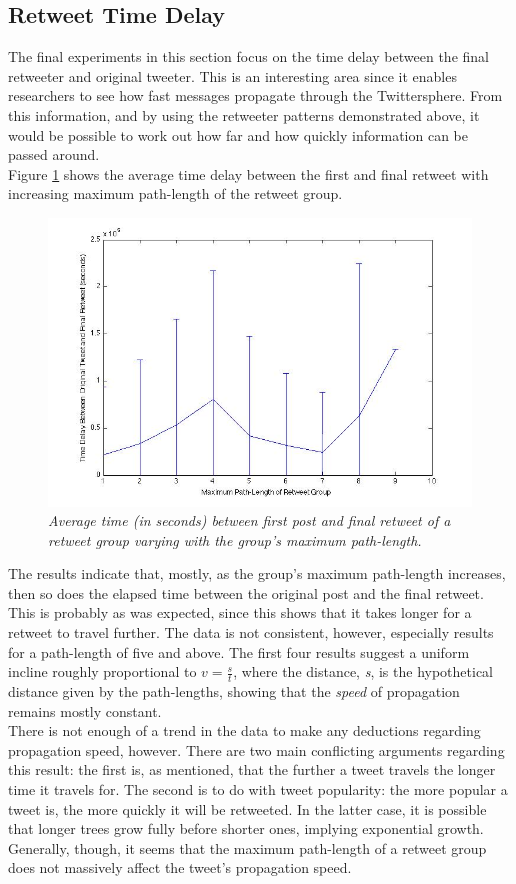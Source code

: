 \subsection{Retweet Time Delay}
\label{retweet time delay}
The final experiments in this section focus on the time delay between the final retweeter and original tweeter. This is an interesting area since it enables researchers to see how fast messages propagate through the Twittersphere. From this information, and by using the retweeter patterns demonstrated above, it would be possible to work out how far and how quickly information can be passed around.\\
Figure \ref{fig:timedelay-pathlength} shows the average time delay between the first and final retweet with increasing maximum path-length of the retweet group.\\
\begin{figure}[h]
\includegraphics[scale=0.35]{3.Chapter1/Media/pathlength-timedelay.jpg} 
\caption{\textit{Average time (in seconds) between first post and final retweet of a retweet group varying with the group's maximum path-length.}}
\label{fig:timedelay-pathlength}
\end{figure}
The results indicate that, mostly, as the group's maximum path-length increases, then so does the elapsed time between the original post and the final retweet. This is probably as was expected, since this shows that it takes longer for a retweet to travel further. The data is not consistent, however, especially results for a path-length of five and above. The first four results suggest a uniform incline roughly proportional to $ v=\frac{s}{t} $, where the distance, \textit{s}, is the hypothetical distance given by the path-lengths, showing that the \textit{speed} of propagation remains mostly constant.\\
There is not enough of a trend in the data to make any deductions regarding propagation speed, however. There are two main conflicting arguments regarding this result: the first is, as mentioned, that the further a tweet travels the longer time it travels for. The second is to do with tweet popularity: the more popular a tweet is, the more quickly it will be retweeted. In the latter case, it is possible that longer trees grow fully before shorter ones, implying exponential growth. Generally, though, it seems that the maximum path-length of a retweet group does not massively affect the tweet's propagation speed.

